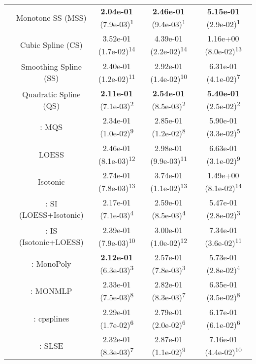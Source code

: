 \begin{tabular}{ccccc}
&Monotone SS (MSS)& \textbf{2.04e-01} (7.9e-03)\textsuperscript{1}& \textbf{2.46e-01} (9.4e-03)\textsuperscript{1}& \textbf{5.15e-01} (2.9e-02)\textsuperscript{1}\tabularnewline
&Cubic Spline (CS)& 3.52e-01 (1.7e-02)\textsuperscript{14}& 4.39e-01 (2.2e-02)\textsuperscript{14}& 1.16e+00 (8.0e-02)\textsuperscript{13}\tabularnewline
&Smoothing Spline (SS)& 2.40e-01 (1.2e-02)\textsuperscript{11}& 2.92e-01 (1.4e-02)\textsuperscript{10}& 6.31e-01 (4.1e-02)\textsuperscript{7}\tabularnewline
&Quadratic Spline (QS)& \textbf{2.11e-01} (7.1e-03)\textsuperscript{2}& \textbf{2.54e-01} (8.5e-03)\textsuperscript{2}& \textbf{5.40e-01} (2.5e-02)\textsuperscript{2}\tabularnewline
&\textcite{heMonotoneBsplineSmoothing1998}: MQS& 2.34e-01 (1.0e-02)\textsuperscript{9}& 2.85e-01 (1.2e-02)\textsuperscript{8}& 5.90e-01 (3.3e-02)\textsuperscript{5}\tabularnewline
&LOESS& 2.46e-01 (8.1e-03)\textsuperscript{12}& 2.98e-01 (9.9e-03)\textsuperscript{11}& 6.63e-01 (3.1e-02)\textsuperscript{9}\tabularnewline
&Isotonic& 2.74e-01 (7.8e-03)\textsuperscript{13}& 3.74e-01 (1.1e-02)\textsuperscript{13}& 1.49e+00 (8.1e-02)\textsuperscript{14}\tabularnewline
&\textcite{mammenEstimatingSmoothMonotone1991}: SI (LOESS+Isotonic)& 2.17e-01 (7.1e-03)\textsuperscript{4}& 2.59e-01 (8.5e-03)\textsuperscript{4}& 5.47e-01 (2.8e-02)\textsuperscript{3}\tabularnewline
&\textcite{mammenEstimatingSmoothMonotone1991}: IS (Isotonic+LOESS)& 2.39e-01 (7.9e-03)\textsuperscript{10}& 3.00e-01 (1.0e-02)\textsuperscript{12}& 7.34e-01 (3.6e-02)\textsuperscript{11}\tabularnewline
&\textcite{murrayFastFlexibleMethods2016}: MonoPoly& \textbf{2.12e-01} (6.3e-03)\textsuperscript{3}& 2.57e-01 (7.8e-03)\textsuperscript{3}& 5.73e-01 (2.8e-02)\textsuperscript{4}\tabularnewline
&\textcite{cannonMonmlpMultilayerPerceptron2017}: MONMLP& 2.33e-01 (7.5e-03)\textsuperscript{8}& 2.82e-01 (8.3e-03)\textsuperscript{7}& 6.35e-01 (3.5e-02)\textsuperscript{8}\tabularnewline
&\textcite{navarro-garciaConstrainedSmoothingOutofrange2023}: cpsplines& 2.29e-01 (1.7e-02)\textsuperscript{6}& 2.79e-01 (2.0e-02)\textsuperscript{6}& 6.17e-01 (6.1e-02)\textsuperscript{6}\tabularnewline
&\textcite{groeneboomConfidenceIntervalsMonotone2023}: SLSE& 2.32e-01 (8.3e-03)\textsuperscript{7}& 2.87e-01 (1.1e-02)\textsuperscript{9}& 7.16e-01 (4.4e-02)\textsuperscript{10}\tabularnewline
\bottomrule
\end{tabular}
